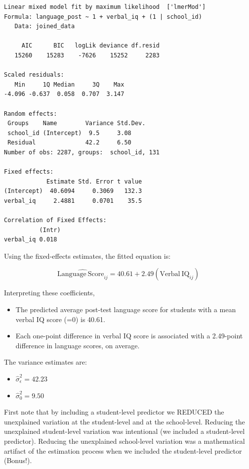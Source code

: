 \documentclass[]{book}
\providecommand{\tightlist}{%
  \setlength{\itemsep}{0pt}\setlength{\parskip}{0pt}}
\begin{document}
\begin{verbatim}
Linear mixed model fit by maximum likelihood  ['lmerMod']
Formula: language_post ~ 1 + verbal_iq + (1 | school_id)
   Data: joined_data

     AIC      BIC   logLik deviance df.resid 
   15260    15283    -7626    15252     2283 

Scaled residuals: 
   Min     1Q Median     3Q    Max 
-4.096 -0.637  0.058  0.707  3.147 

Random effects:
 Groups    Name        Variance Std.Dev.
 school_id (Intercept)  9.5     3.08    
 Residual              42.2     6.50    
Number of obs: 2287, groups:  school_id, 131

Fixed effects:
            Estimate Std. Error t value
(Intercept)  40.6094     0.3069   132.3
verbal_iq     2.4881     0.0701    35.5

Correlation of Fixed Effects:
          (Intr)
verbal_iq 0.018 
\end{verbatim}

Using the fixed-effects estimates, the fitted equation is:

\[
\hat{\mathrm{Language~Score}_{ij}} = 40.61 + 2.49(\mathrm{Verbal~IQ}_{ij})
\]

Interpreting these coefficients,

\begin{itemize}
\tightlist
\item
  The predicted average post-test language score for students with a mean verbal IQ score (=0) is 40.61.
\item
  Each one-point difference in verbal IQ score is associated with a 2.49-point difference in language scores, on average.
\end{itemize}

The variance estimates are:

\begin{itemize}
\tightlist
\item
  \(\hat\sigma^2_{\epsilon} = 42.23\)
\item
  \(\hat\sigma^2_0 = 9.50\)
\end{itemize}

First note that by including a student-level predictor we REDUCED the unexplained variation at the student-level and at the school-level. Reducing the unexplained student-level variation was intentional (we included a student-level predictor). Reducing the unexplained school-level variation was a mathematical artifact of the estimation process when we included the student-level predictor (Bonus!).
\end{document}
